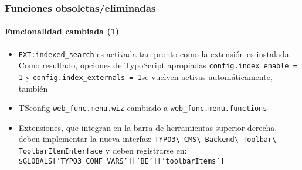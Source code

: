 \begin{frame}[fragile]
	\frametitle{Funciones obsoletas/eliminadas}
	\framesubtitle{Funcionalidad cambiada (1)}

	\begin{itemize}

		\item \texttt{EXT:indexed\_search} es activada tan pronto como la extensión es instalada.
			Como resultado, opciones de TypoScript apropiadas \small\texttt{config.index\_enable = 1}\normalsize
			y \small\texttt{config.index\_externals = 1}\normalsize se vuelven activas automáticamente, también

		\item TSconfig \small\texttt{web\_func.menu.wiz}\normalsize\space
			cambiado a \small\texttt{web\_func.menu.functions}\normalsize

		\item Extensiones, que integran en la barra de herramientas superior derecha, deben implementar la nueva interfaz:
			\small
				\texttt{TYPO3\textbackslash
					CMS\textbackslash
					Backend\textbackslash
					Toolbar\textbackslash
					ToolbarItemInterface}
			\normalsize\newline
			y deben registrarse en:
			\small
				\texttt{\$GLOBALS['TYPO3\_CONF\_VARS']['BE']['toolbarItems']}
			\normalsize

	\end{itemize}

\end{frame}


